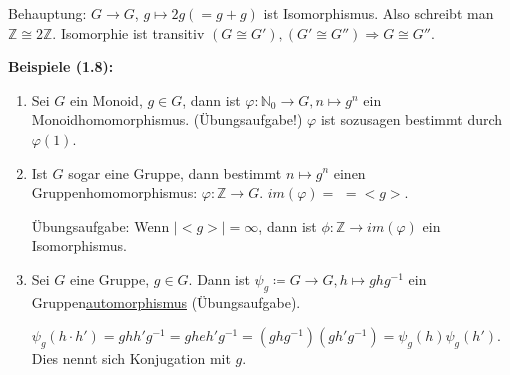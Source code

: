 \documentclass[10pt,a4paper]{article}
\begin{document}
Behauptung: $G \to G$, $g \mapsto 2g (= g + g)$ ist Isomorphismus. Also schreibt man $\mathbb{Z} \cong 2\mathbb{Z}$. Isomorphie ist transitiv $(G \cong G'), (G' \cong G'') \Rightarrow G \cong G''$.\bigskip

\textbf{Beispiele (1.8):}
\begin{enumerate}
\item Sei $G$ ein Monoid, $g \in G$, dann ist $\varphi : \mathbb{N}_0 \to G, n \mapsto g^n$ ein Monoidhomomorphismus. (Übungsaufgabe!) $\varphi$ ist sozusagen bestimmt durch $\varphi(1)$. 

\item Ist $G$ sogar eine Gruppe, dann bestimmt $n \mapsto g^n$ einen Gruppenhomomorphismus: $\varphi : \mathbb{Z} \to G$. $im(\varphi) = $  $= < g >$.

Übungsaufgabe: Wenn $\vert <g> \vert = \infty$, dann ist $\phi : \mathbb{Z} \to im(\varphi)$ ein Isomorphismus.

\item Sei $G$ eine Gruppe, $g \in G$. Dann ist $\psi_g \coloneqq G \to G, h \mapsto g h g^{-1}$ ein Gruppen\underline{automorphismus} (Übungsaufgabe).

$\psi_g(h \cdot h') = g h h' g^{-1} = gheh'g^{-1} = (ghg^{-1})(gh'g^{-1}) = \psi_g(h) \psi_g(h')$. Dies nennt sich \glqq Konjugation mit $g$\grqq .
\end{enumerate}
\end{document}
